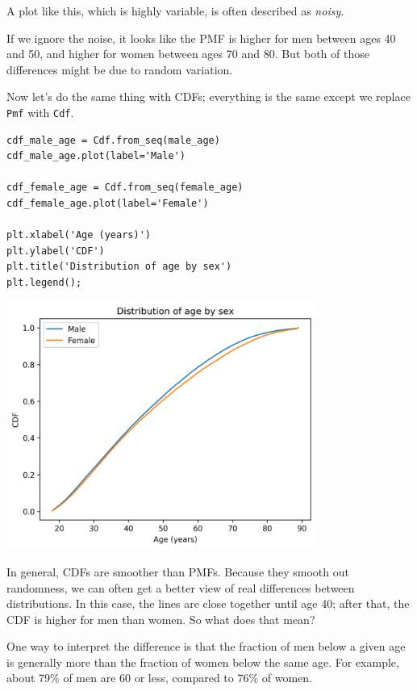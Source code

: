 A plot like this, which is highly variable, is often described as
\emph{noisy}.

If we ignore the noise, it looks like the PMF is higher for men between
ages 40 and 50, and higher for women between ages 70 and 80. But both of
those differences might be due to random variation.

Now let's do the same thing with CDFs; everything is the same except we
replace \passthrough{\lstinline!Pmf!} with
\passthrough{\lstinline!Cdf!}.

\begin{lstlisting}[]
cdf_male_age = Cdf.from_seq(male_age)
cdf_male_age.plot(label='Male')

cdf_female_age = Cdf.from_seq(female_age)
cdf_female_age.plot(label='Female')

plt.xlabel('Age (years)') 
plt.ylabel('CDF')
plt.title('Distribution of age by sex')
plt.legend();
\end{lstlisting}

\begin{center}
\includegraphics[width=4in]{chapters/08_distributions_files/08_distributions_90_0.png}
\end{center}

In general, CDFs are smoother than PMFs. Because they smooth out
randomness, we can often get a better view of real differences between
distributions. In this case, the lines are close together until age 40;
after that, the CDF is higher for men than women. So what does that
mean?

One way to interpret the difference is that the fraction of men below a
given age is generally more than the fraction of women below the same
age. For example, about 79\% of men are 60 or less, compared to 76\% of
women.

